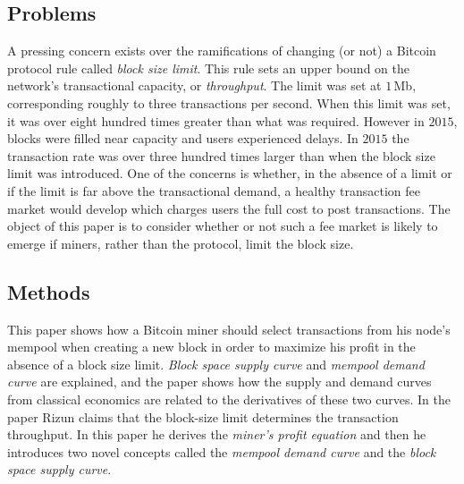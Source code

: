\documentclass[USenglish]{uit-thesis}
\begin{document}
\subsection{Problems}
A pressing concern exists over the ramifications of changing (or not)
a Bitcoin protocol rule called \emph{block size limit}. This rule sets an
upper bound on the network's transactional capacity, or \emph{throughput}.
The limit was set at $1$\,Mb, corresponding roughly to three transactions
per second. When this limit was set, it was over eight hundred times
greater than what was required. However in $2015$, blocks
were filled near capacity and users experienced delays. In $2015$
the transaction rate was over three hundred times larger
than when the block size limit was introduced. One of the
concerns is whether, in the absence of a limit or if the limit
is far above the transactional demand, a healthy transaction
fee market would develop which charges users the full
cost to post transactions. The object
of this paper is to consider whether or not such a fee
market is likely to emerge if miners, rather than the protocol,
limit the block size.
\subsection{Methods}
This paper shows how a Bitcoin miner should
select transactions from his node's mempool
when creating a new block in order to maximize
his profit in the absence of a block size limit.
\emph{Block space supply curve} and
\emph{mempool demand curve} are explained, and the
paper shows how the supply and demand
curves from classical economics are related to the
derivatives of these two curves.
In the paper Rizun claims that the block-size limit determines the
transaction throughput. In this paper he derives
the \emph{miner's profit equation} and then
he introduces two novel concepts called
the \emph{mempool demand curve} and the
\emph{block space supply curve}.
\end{document}
